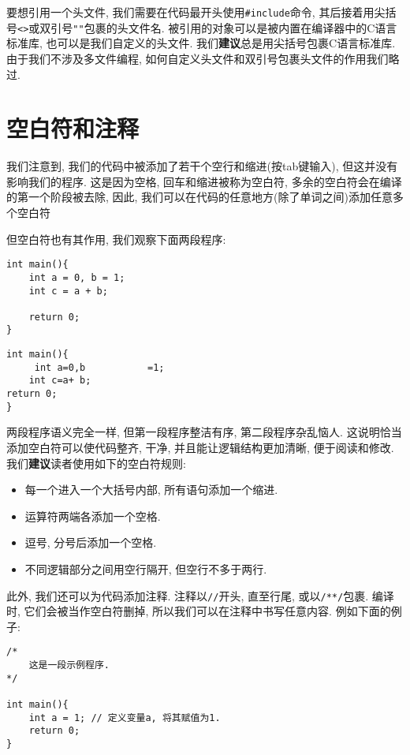         要想引用一个头文件, 我们需要在代码最开头使用\texttt{\#include}命令, 其后接着用尖括号\texttt{<>}或双引号\texttt{""}包裹的头文件名. 被引用的对象可以是被内置在编译器中的C语言标准库, 也可以是我们自定义的头文件. 我们\textbf{建议}总是用尖括号包裹C语言标准库. 由于我们不涉及多文件编程, 如何自定义头文件和双引号包裹头文件的作用我们略过.

    \section{空白符和注释} \label{空白符和注释}
        我们注意到, 我们的代码中被添加了若干个空行和缩进(按tab键输入), 但这并没有影响我们的程序. 这是因为空格, 回车和缩进被称为空白符, 多余的空白符会在编译的第一个阶段被去除, 因此, 我们可以在代码的任意地方(除了单词之间)添加任意多个空白符

        但空白符也有其作用, 我们观察下面两段程序:
\begin{lstlisting}
int main(){
    int a = 0, b = 1;
    int c = a + b;

    return 0;
}
\end{lstlisting}

\begin{lstlisting}
int main(){
     int a=0,b           =1;
    int c=a+ b;
return 0;
}
\end{lstlisting}

        两段程序语义完全一样, 但第一段程序整洁有序, 第二段程序杂乱恼人. 这说明恰当添加空白符可以使代码整齐, 干净, 并且能让逻辑结构更加清晰, 便于阅读和修改. 我们\textbf{建议}读者使用如下的空白符规则:
        \begin{itemize}
            \item 每一个进入一个大括号内部, 所有语句添加一个缩进.
            \item 运算符两端各添加一个空格.
            \item 逗号, 分号后添加一个空格.
            \item 不同逻辑部分之间用空行隔开, 但空行不多于两行.
        \end{itemize}

        此外, 我们还可以为代码添加注释. 注释以\texttt{//}开头, 直至行尾, 或以\texttt{/**/}包裹. 编译时, 它们会被当作空白符删掉, 所以我们可以在注释中书写任意内容. 例如下面的例子:
\begin{lstlisting}
/*
    这是一段示例程序.
*/

int main(){
    int a = 1; // 定义变量a, 将其赋值为1.
    return 0;
}
\end{lstlisting}

